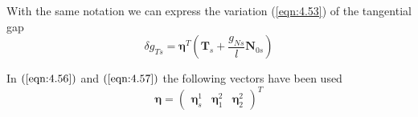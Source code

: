 With the same notation we can express the variation (\ref{eqn:4.53}) of the tangential gap
\begin{equation}
    \delta g_{T s}=\boldsymbol{\eta}^{T}\left(\mathbf{T}_{s}+\frac{g_{N s}}{l} \mathbf{N}_{0 s}\right)
\label{eqn:4.57}
\end{equation}

In $ (\ref{eqn:4.56}) $ and $ (\ref{eqn:4.57}) $ the following vectors have been used
\begin{equation}
 \boldsymbol{\eta}=\left(\begin{array}{lll}\boldsymbol{\eta}_{s}^{1} & \boldsymbol{\eta}_{1}^{2} & \boldsymbol{\eta}_{2}^{2}\end{array}\right)^{T} 
 \label{eqn:4.58}
\end{equation}





% 
% 